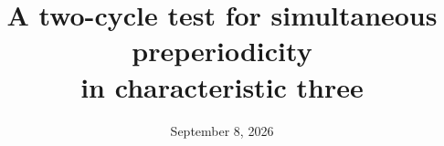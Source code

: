 \documentclass[11pt]{article}
\title{A two-cycle test for simultaneous preperiodicity\\
in characteristic three}
\author{}
\date{September 8, 2026}
\begin{document}
\maketitle
\begin{abstract}

\end{abstract}







\end{document}
